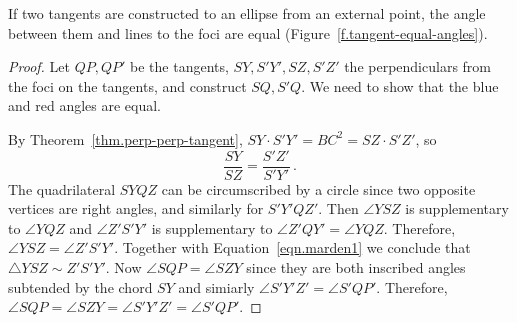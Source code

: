 \begin{theorem}\label{thm.marden-tangent} If two tangents are constructed to an ellipse from an external point, the angle between them and lines to the foci are equal (Figure~\ref{f.tangent-equal-angles}).
\end{theorem}

\begin{proof}
Let $QP, QP'$ be the tangents, $SY, S'Y', SZ, S'Z'$ the perpendiculars
from the foci on the tangents, and construct $SQ,S'Q$. We need to show that the blue and red angles are equal. 

By Theorem~\ref{thm.perp-perp-tangent}, $SY\cdot S'Y'=BC^2= SZ\cdot S'Z'$, so
\begin{equation}\label{eqn.marden1}
\frac{SY}{SZ} = \frac{S'Z'}{S'Y'}\,.
\end{equation}
The quadrilateral $SYQZ$ can be circumscribed by a circle since two opposite vertices are right angles, and similarly for $S'Y'QZ'$. Then $\angle YSZ$ is supplementary to $\angle YQZ$ and $\angle Z'S'Y'$ is supplementary to $\angle Z'QY'=\angle YQZ$. Therefore, $\angle YSZ=\angle Z'S'Y'$. Together with Equation~\ref{eqn.marden1} we conclude that $\triangle YSZ\sim Z'S'Y'$. Now $\angle SQP = \angle SZY$ since they are both inscribed angles subtended by the chord $SY$ and simiarly $\angle S'Y'Z'=\angle S'QP'$. Therefore, $\angle SQP=\angle SZY = \angle S'Y'Z'=\angle S'QP'$.\hqed
\end{proof}

